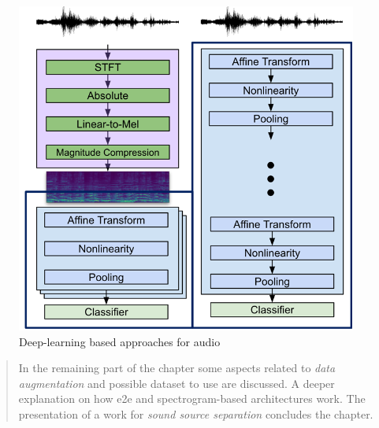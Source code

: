  \begin{figure}
    \centering
    \includegraphics[scale=0.7]{img/DL_audio.png}
    \caption{Deep-learning based approaches for audio}
 \end{figure}

\begin{quotation}
    \noindent
    \textsf{In the remaining part of the chapter some aspects related to \textit{data augmentation} and possible dataset to use are discussed. A deeper explanation on how e2e and spectrogram-based architectures work. The presentation of a work for \textit{sound source separation} concludes the chapter.}
\end{quotation}


